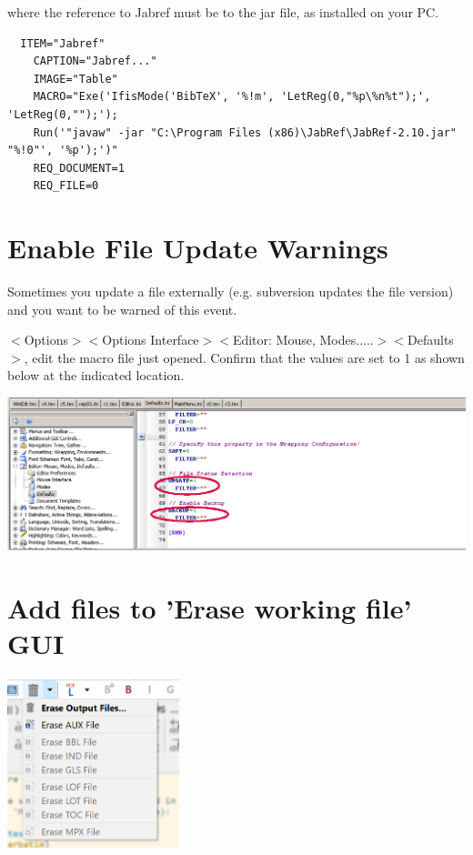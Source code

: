 where the reference to Jabref must be to the jar file, as installed on your PC.

{\footnotesize
\begin{verbatim}
  ITEM="Jabref"
    CAPTION="Jabref..."
    IMAGE="Table"
    MACRO="Exe('IfisMode('BibTeX', '%!m', 'LetReg(0,"%p\%n%t");', 'LetReg(0,"");');
    Run('"javaw" -jar "C:\Program Files (x86)\JabRef\JabRef-2.10.jar" "%!0"', '%p');')"
    REQ_DOCUMENT=1
    REQ_FILE=0
\end{verbatim}
}


\section{Enable File Update Warnings}

Sometimes you update a file externally (e.g. subversion updates the file version) and you want to be warned of this event.

$<$Options$>$$<$Options Interface$>$$<$Editor: Mouse, Modes.....$>$$<$Defaults$>$, edit the macro file just opened. Confirm that the values are set to 1 as  shown below at the indicated location.

\centerline{\includegraphics[bb= 0 0 1055 352,width=\textwidth]{eps/updatedrives.png}}


\section{Add files to 'Erase working file' GUI}

\includegraphics[width=50mm]{pic/recycle-clutter.png}

